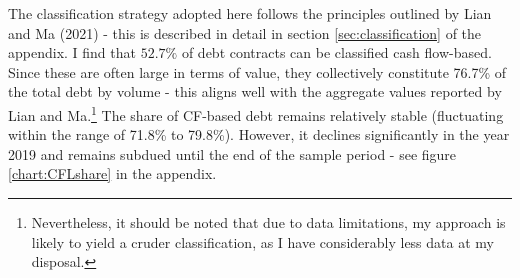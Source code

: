\documentclass[12pt]{article}
\begin{document}
\begin{table}[H]
    \centering
    \caption{\small Summary Statistics - debt contracts between 2010Q1 and 2023Q2}
    \label{tab:sumstat}
\end{table}

\noindent The classification strategy adopted here follows the principles outlined by Lian and Ma (2021) - this is described in detail in section \ref{sec:classification} of the appendix. I find that $52.7\%$ of debt contracts can be classified cash flow-based. Since these are often large in terms of value, they collectively constitute 76.7\% of the total debt by volume - this aligns well with the aggregate values reported by Lian and Ma.\footnote{Nevertheless, it should be noted that due to data limitations, my approach is likely to yield a cruder classification, as I have considerably less data at my disposal.} The share of CF-based debt remains relatively stable (fluctuating within the range of 71.8\% to 79.8\%). However, it declines significantly in the year 2019 and remains subdued until the end of the sample period - see figure \ref{chart:CFLshare} in the appendix. 
\end{document}
